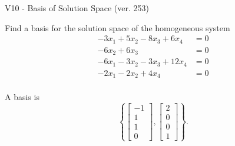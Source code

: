 \begin{exercise}
  \begin{exerciseTitle}V10 - Basis of Solution Space (ver. 253)\end{exerciseTitle}
  \begin{exerciseStatement}
    Find a basis for the solution space of the homogeneous system 
\begin{align*}
 -3 x_ 1 + 5 x_ 2 -8 x_ 3 + 6 x_ 4 &= 0  \\ 
  -6 x_ 2 + 6 x_ 3 &= 0  \\ 
  -6 x_ 1 -3 x_ 2 -3 x_ 3 + 12 x_ 4 &= 0  \\ 
  -2 x_ 1 -2 x_ 2 + 4 x_ 4 &= 0  \\ 
 \end{align*}


 
  \end{exerciseStatement}

  \begin{exerciseAnswer}
   A basis is   
\[\left\{\left[\begin{array}{c}
-1 \\
1 \\
1 \\
0
\end{array}\right] , \left[\begin{array}{c}
2 \\
0 \\
0 \\
1
\end{array}\right]\right\}.\]

  


  \end{exerciseAnswer}
\end{exercise}